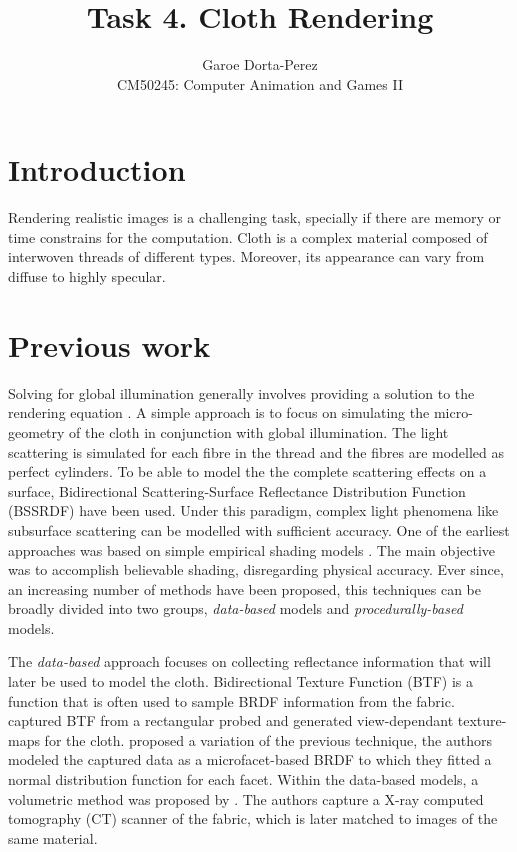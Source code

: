 \documentclass[12pt]{article}
\begin{document}
  
\title{Task 4. Cloth Rendering}
\author{Garoe Dorta-Perez\\
CM50245: Computer Animation and Games II}
 
\maketitle
 
\section{Introduction}

Rendering realistic images is a challenging task, specially if there are memory or time constrains for the computation.
Cloth is a complex material composed of interwoven threads of different types.
Moreover, its appearance can vary from diffuse to highly specular.

\section{Previous work}

Solving for global illumination generally involves providing a solution to the rendering equation \cite{Kajiya1986}.
A simple approach is to focus on simulating the micro-geometry of the cloth in conjunction with global illumination.
The light scattering is simulated for each fibre in the thread and the fibres are modelled as perfect cylinders.
To be able to model the the complete scattering effects on a surface, Bidirectional Scattering-Surface Reflectance Distribution Function (BSSRDF) \cite{NicodemusFredEandRichmond1977} have been used.
Under this paradigm, complex light phenomena like subsurface scattering can be modelled with sufficient accuracy.
One of the earliest approaches was based on simple empirical shading models \cite{Weft1986}.
The main objective was to accomplish believable shading, disregarding physical accuracy.
Ever since, an increasing number of methods have been proposed, this techniques can be broadly divided into two groups, \emph{data-based} models and \emph{procedurally-based} models.

The \emph{data-based} approach focuses on collecting reflectance information that will later be used to model the cloth.
Bidirectional Texture Function (BTF) \cite{Dana1999} is a function that is often used to sample BRDF information from the fabric.
\citeauthor{Sattler2003} \cite{Sattler2003} captured BTF from a rectangular probed and generated view-dependant texture-maps for the cloth.
\citeauthor{Wang2008} \cite{Wang2008} proposed a variation of the previous technique, the authors modeled the captured data as a microfacet-based BRDF to which they fitted a normal distribution function for each facet.
Within the data-based models, a volumetric method was proposed by \citeauthor{Zhao2011} \cite{Zhao2011}.
The authors capture a X-ray computed tomography (CT) scanner of the fabric, which is later matched to images of the same material.
\end{document}
